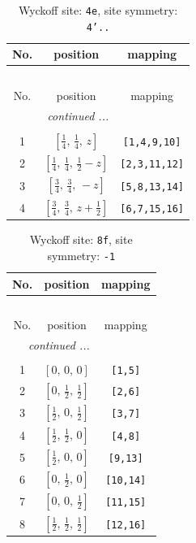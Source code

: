 \documentclass[fleqn,8pt]{jsarticle}
\begin{document}
\renewcommand{\arraystretch}{1.2}
\begin{longtable}{ccc}
\caption{Wyckoff site: {\tt 4e}, site symmetry: {\tt 4'..}}
 \\
 \hline \hline
No. & position & mapping \\ \hline \endfirsthead

\multicolumn{2}{l}{\tablename\ \thetable{}} \\
 \hline \hline
No. & position & mapping \\ \hline \endhead

 \hline \hline
\multicolumn{2}{r}{\footnotesize\it continued ...} \\ \endfoot

 \hline \hline
\multicolumn{2}{r}{} \\ \endlastfoot

1 & $\left[ \frac{1}{4},\, \frac{1}{4},\, z \right]$ & {\tt [1,4,9,10]} \\ \hline
2 & $\left[ \frac{1}{4},\, \frac{1}{4},\, \frac{1}{2} - z \right]$ & {\tt [2,3,11,12]} \\ \hline
3 & $\left[ \frac{3}{4},\, \frac{3}{4},\, - z \right]$ & {\tt [5,8,13,14]} \\ \hline
4 & $\left[ \frac{3}{4},\, \frac{3}{4},\, z + \frac{1}{2} \right]$ & {\tt [6,7,15,16]} \\
\end{longtable}
\renewcommand{\arraystretch}{1.2}
\begin{longtable}{ccc}
\caption{Wyckoff site: {\tt 8f}, site symmetry: {\tt -1}}
 \\
 \hline \hline
No. & position & mapping \\ \hline \endfirsthead

\multicolumn{2}{l}{\tablename\ \thetable{}} \\
 \hline \hline
No. & position & mapping \\ \hline \endhead

 \hline \hline
\multicolumn{2}{r}{\footnotesize\it continued ...} \\ \endfoot

 \hline \hline
\multicolumn{2}{r}{} \\ \endlastfoot

1 & $\left[ 0,\, 0,\, 0 \right]$ & {\tt [1,5]} \\ \hline
2 & $\left[ 0,\, \frac{1}{2},\, \frac{1}{2} \right]$ & {\tt [2,6]} \\ \hline
3 & $\left[ \frac{1}{2},\, 0,\, \frac{1}{2} \right]$ & {\tt [3,7]} \\ \hline
4 & $\left[ \frac{1}{2},\, \frac{1}{2},\, 0 \right]$ & {\tt [4,8]} \\ \hline
5 & $\left[ \frac{1}{2},\, 0,\, 0 \right]$ & {\tt [9,13]} \\ \hline
6 & $\left[ 0,\, \frac{1}{2},\, 0 \right]$ & {\tt [10,14]} \\ \hline
7 & $\left[ 0,\, 0,\, \frac{1}{2} \right]$ & {\tt [11,15]} \\ \hline
8 & $\left[ \frac{1}{2},\, \frac{1}{2},\, \frac{1}{2} \right]$ & {\tt [12,16]} \\
\end{longtable}
\end{document}
